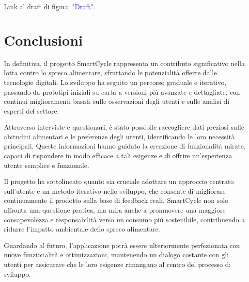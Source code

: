 \documentclass{article}
\begin{document}
Link al draft di figma: \href{https://www.figma.com/design/xET26iTanAxBERu0jhT0FS/Task?m=auto&t=qPEiaYbMaGbBwjH1-6}{"\textcolor{blue}{Draft}"}.


\newpage
\section{Conclusioni}

In definitiva, il progetto SmartCycle rappresenta un contributo significativo nella lotta contro lo spreco alimentare, sfruttando le potenzialità offerte dalle tecnologie digitali. Lo sviluppo ha seguito un percorso graduale e iterativo, passando da prototipi iniziali su carta a versioni più avanzate e dettagliate, con continui miglioramenti basati sulle osservazioni degli utenti e sulle analisi di esperti del settore.

Attraverso interviste e questionari, è stato possibile raccogliere dati preziosi sulle abitudini alimentari e le preferenze degli utenti, identificando le loro necessità principali. Queste informazioni hanno guidato la creazione di funzionalità mirate, capaci di rispondere in modo efficace a tali esigenze e di offrire un'esperienza utente semplice e funzionale.

Il progetto ha sottolineato quanto sia cruciale adottare un approccio centrato sull'utente e un metodo iterativo nello sviluppo, che consente di migliorare continuamente il prodotto sulla base di feedback reali. SmartCycle non solo affronta una questione pratica, ma mira anche a promuovere una maggiore consapevolezza e responsabilità verso un consumo più sostenibile, contribuendo a ridurre l'impatto ambientale dello spreco alimentare.

Guardando al futuro, l'applicazione potrà essere ulteriormente perfezionata con nuove funzionalità e ottimizzazioni, mantenendo un dialogo costante con gli utenti per assicurare che le loro esigenze rimangano al centro del processo di sviluppo.
\end{document}
